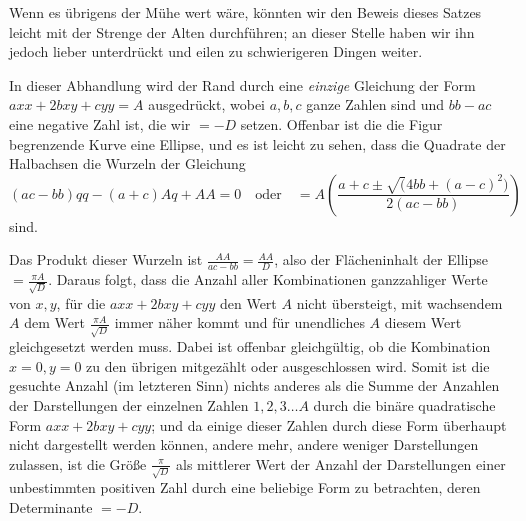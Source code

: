 Wenn es übrigens der Mühe wert wäre, könnten wir den Beweis dieses Satzes leicht mit der Strenge der Alten durchführen; an dieser Stelle haben wir ihn jedoch lieber unterdrückt und eilen zu schwierigeren Dingen weiter.

In dieser Abhandlung wird der Rand durch eine \emph{einzige} Gleichung der Form $axx+2bxy+cyy=A$ ausgedrückt, wobei $a,b,c$ ganze Zahlen sind und $bb-ac$ eine negative Zahl ist, die wir $=-D$ setzen. Offenbar ist die die Figur begrenzende Kurve eine Ellipse, und es ist leicht zu sehen, dass die Quadrate der Halbachsen die Wurzeln der Gleichung
\[
(ac-bb)qq-(a+c)Aq+AA=0\quad\text{oder}\quad
=A\left(\frac{a+c\pm\surd(4bb+(a-c)^2)}{2(ac-bb)}\right)
\]
sind.

Das Produkt dieser Wurzeln ist $\frac{AA}{ac-bb}=\frac{AA}D$, also der Flächeninhalt der Ellipse $=\frac{\pi A}{\surd D}$. Daraus folgt, dass die Anzahl aller Kombinationen ganzzahliger Werte von $x,y$, für die $axx+2bxy+cyy$ den Wert $A$ nicht übersteigt, mit wachsendem $A$ dem Wert $\frac{\pi A}{\surd D}$ immer näher kommt und für unendliches $A$ diesem Wert gleichgesetzt werden muss. Dabei ist offenbar gleichgültig, ob die Kombination $x=0,y=0$ zu den übrigen mitgezählt oder ausgeschlossen wird. Somit ist die gesuchte Anzahl (im letzteren Sinn) nichts anderes als die Summe der Anzahlen der Darstellungen der einzelnen Zahlen $1,2,3\ldots A$ durch die binäre quadratische Form $axx+2bxy+cyy$; und da einige dieser Zahlen durch diese Form überhaupt nicht dargestellt werden können, andere mehr, andere weniger Darstellungen zulassen, ist die Größe $\frac\pi{\surd D}$ als mittlerer Wert der Anzahl der Darstellungen einer unbestimmten positiven Zahl durch eine beliebige Form zu betrachten, deren Determinante $=-D$.
